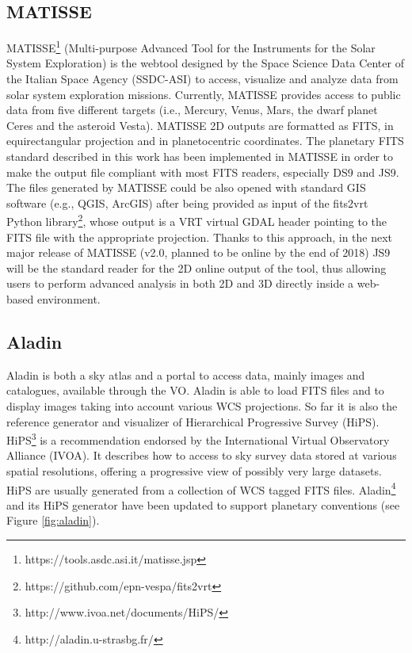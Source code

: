 \subsection{MATISSE}
MATISSE\footnote{https://tools.asdc.asi.it/matisse.jsp} (Multi-purpose Advanced Tool
for the Instruments for the Solar System Exploration) \citep{ZINZI2016} is the webtool
designed by the Space Science Data Center of the Italian Space Agency (SSDC-ASI) to
access, visualize and analyze data from solar system exploration missions.
Currently, MATISSE provides access to public data from five different targets (i.e., Mercury,
Venus, Mars, the dwarf planet Ceres and the asteroid Vesta).
MATISSE 2D outputs are formatted as FITS, in equirectangular projection and in planetocentric coordinates.
The planetary FITS standard described in this work has been implemented in MATISSE in order to make the output
file compliant with most FITS readers, especially DS9 and JS9.
The files generated by MATISSE could be also opened with standard GIS software (e.g.,
QGIS, ArcGIS) 
after being provided as input of the fits2vrt Python library\footnote{https://github.com/epn-vespa/fits2vrt},
whose output is a VRT virtual GDAL header pointing to the FITS file with the appropriate
projection.
Thanks to this approach, in the next major release of MATISSE (v2.0, planned to be
online by the end of 2018) JS9 will be the standard reader for
the 2D online output of the tool, thus allowing users to perform advanced analysis in
both 2D and 3D directly inside a web-based environment.

\subsection{Aladin}
Aladin is both a sky atlas and a portal to access data, mainly images and
catalogues, available through the VO.
Aladin is able to load FITS files and to display images taking into account various
WCS projections.
So far it is also the reference generator and visualizer of Hierarchical
Progressive Survey (HiPS).
HiPS\footnote{http://www.ivoa.net/documents/HiPS/} is a recommendation endorsed
by the International Virtual Observatory Alliance (IVOA).
It describes how to access to sky survey data stored at various spatial
resolutions, offering a progressive view of possibly very large datasets.
HiPS are usually generated from a collection of WCS tagged FITS files.
Aladin\footnote{http://aladin.u-strasbg.fr/} \citep{aladin} and its HiPS generator have
been updated to support planetary conventions (see Figure \ref{fig:aladin}).

